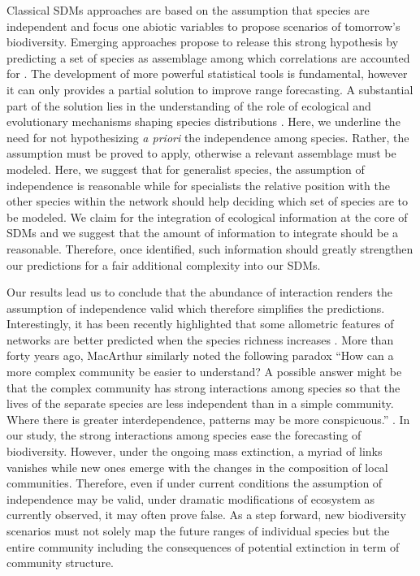Classical SDMs approaches are based on the assumption that species are
independent and focus one abiotic variables \citep{Jeschke2008} to
propose scenarios of tomorrow's biodiversity. Emerging approaches
propose to release this strong hypothesis by predicting a set of species
as assemblage among which correlations are accounted for
\citep{Pollock2014, Warton2015b}. The development of more powerful
statistical tools is fundamental, however it can only provides a partial
solution to improve range forecasting. A substantial part of the
solution lies in the understanding of the role of ecological and
evolutionary mechanisms shaping species distributions
\citep{Thuiller2013}. Here, we underline the need for not hypothesizing
\emph{a priori} the independence among species. Rather, the assumption
must be proved to apply, otherwise a relevant assemblage must be
modeled. Here, we suggest that for generalist species, the assumption of
independence is reasonable while for specialists the relative position
with the other species within the network should help deciding which set
of species are to be modeled. We claim for the integration of ecological
information at the core of SDMs and we suggest that the amount of
information to integrate should be a reasonable. Therefore, once
identified, such information should greatly strengthen our predictions
for a fair additional complexity into our SDMs.

Our results lead us to conclude that the abundance of interaction
renders the assumption of independence valid which therefore simplifies
the predictions. Interestingly, it has been recently highlighted that
some allometric features of networks are better predicted when the
species richness increases \citep{Berlow2009}. More than forty years
ago, MacArthur similarly noted the following paradox ``How can a more
complex community be easier to understand? A possible answer might be
that the complex community has strong interactions among species so that
the lives of the separate species are less independent than in a simple
community. Where there is greater interdependence, patterns may be more
conspicuous.'' \citep[p.199]{macarthur1972geographical}. In our study,
the strong interactions among species ease the forecasting of
biodiversity. However, under the ongoing mass extinction, a myriad of
links vanishes while new ones emerge with the changes in the composition
of local communities. Therefore, even if under current conditions the
assumption of independence may be valid, under dramatic modifications of
ecosystem as currently observed, it may often prove false. As a step
forward, new biodiversity scenarios must not solely map the future
ranges of individual species but the entire community including the
consequences of potential extinction in term of community structure.

